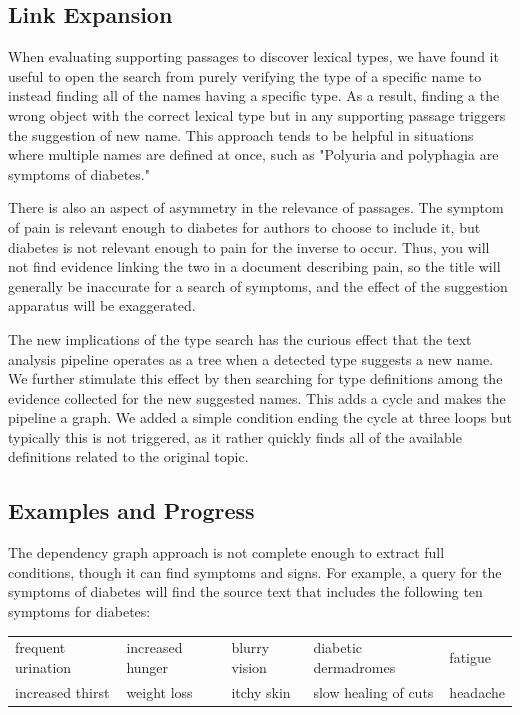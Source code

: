\documentclass[12pt,letterpaper]{article}
\begin{document}
\subsection{Link Expansion}
When evaluating supporting passages to discover lexical types, we have found it useful to open the search from purely verifying the type of a specific name to instead finding all of the names having a specific type. As a result, finding a the wrong object with the correct lexical type but in any supporting passage triggers the suggestion of new name. This approach tends to be helpful in situations where multiple names are defined at once, such as "Polyuria and polyphagia are symptoms of diabetes."

There is also an aspect of asymmetry in the relevance of passages. The symptom of pain is relevant enough to diabetes for authors to choose to include it, but diabetes is not relevant enough to pain for the inverse to occur. Thus, you will not find evidence linking the two in a document describing pain, so the title will generally be inaccurate for a search of symptoms, and the effect of the suggestion apparatus will be exaggerated.

The new implications of the type search has the curious effect that the text analysis pipeline operates as a tree when a detected type suggests a new name. We further stimulate this effect by then searching for type definitions among the evidence collected for the new suggested names. This adds a cycle and makes the pipeline a graph. We added a simple condition ending the cycle at three loops but typically this is not triggered, as it rather quickly finds all of the available definitions related to the original topic.


\subsection{Examples and Progress}
The dependency graph approach is not complete enough to extract full conditions, though it can find symptoms and signs. For example, a query for the symptoms of diabetes will find the source text that includes the following ten symptoms for diabetes:

\medskip
\begin{tabular}{lllll}
frequent urination & increased hunger & blurry vision & 
diabetic dermadromes & fatigue \\
increased thirst & weight loss & itchy skin & slow healing of cuts & headache  \\
\end{tabular}
\medskip
\end{document}
